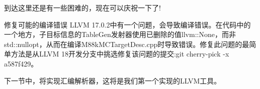 到达这里还是有一些困难的，现在可以庆祝一下了!

\begin{myTip}{修复可能的编译错误}
LLVM 17.0.2中有一个问题，会导致编译错误。在代码中的一个地方，子目标信息的TableGen发射器使用已删除的值llvm::None，而非std::nullopt，从而在编译M88kMCTargetDesc.cpp时导致错误。修复此问题的最简单方法是从LLVM 18开发分支中挑选修复该问题的提交:git cherry-pick -x a587f429。
\end{myTip}

下一节中，将实现汇编解析器，这将是我们第一个实现的LLVM工具。


















































